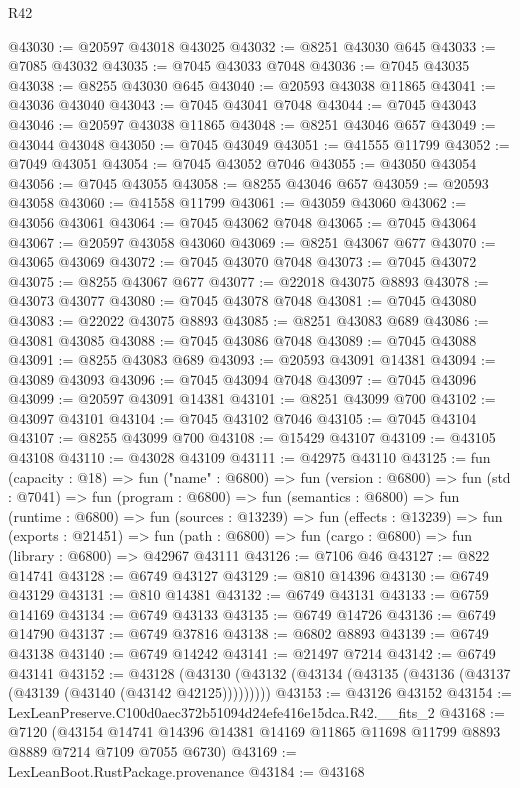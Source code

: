 \begin{lexlean}{R42}
\begin{coremodule}
{@43030 := @20597 @43018 @43025
@43032 := @8251 @43030 @645
@43033 := @7085 @43032
@43035 := @7045 @43033 @7048
@43036 := @7045 @43035
@43038 := @8255 @43030 @645
@43040 := @20593 @43038 @11865
@43041 := @43036 @43040
@43043 := @7045 @43041 @7048
@43044 := @7045 @43043
@43046 := @20597 @43038 @11865
@43048 := @8251 @43046 @657
@43049 := @43044 @43048
@43050 := @7045 @43049
@43051 := @41555 @11799
@43052 := @7049 @43051
@43054 := @7045 @43052 @7046
@43055 := @43050 @43054
@43056 := @7045 @43055
@43058 := @8255 @43046 @657
@43059 := @20593 @43058
@43060 := @41558 @11799
@43061 := @43059 @43060
@43062 := @43056 @43061
@43064 := @7045 @43062 @7048
@43065 := @7045 @43064
@43067 := @20597 @43058 @43060
@43069 := @8251 @43067 @677
@43070 := @43065 @43069
@43072 := @7045 @43070 @7048
@43073 := @7045 @43072
@43075 := @8255 @43067 @677
@43077 := @22018 @43075 @8893
@43078 := @43073 @43077
@43080 := @7045 @43078 @7048
@43081 := @7045 @43080
@43083 := @22022 @43075 @8893
@43085 := @8251 @43083 @689
@43086 := @43081 @43085
@43088 := @7045 @43086 @7048
@43089 := @7045 @43088
@43091 := @8255 @43083 @689
@43093 := @20593 @43091 @14381
@43094 := @43089 @43093
@43096 := @7045 @43094 @7048
@43097 := @7045 @43096
@43099 := @20597 @43091 @14381
@43101 := @8251 @43099 @700
@43102 := @43097 @43101
@43104 := @7045 @43102 @7046
@43105 := @7045 @43104
@43107 := @8255 @43099 @700
@43108 := @15429 @43107
@43109 := @43105 @43108
@43110 := @43028 @43109
@43111 := @42975 @43110
@43125 := fun (capacity : @18) =>
  fun ("name" : @6800) =>
  fun (version : @6800) =>
  fun (std : @7041) =>
  fun (program : @6800) =>
  fun (semantics : @6800) =>
  fun (runtime : @6800) =>
  fun (sources : @13239) =>
  fun (effects : @13239) =>
  fun (exports : @21451) =>
  fun (path : @6800) => fun (cargo : @6800) => fun (library : @6800) => @42967 @43111
@43126 := @7106 @46
@43127 := @822 @14741
@43128 := @6749 @43127
@43129 := @810 @14396
@43130 := @6749 @43129
@43131 := @810 @14381
@43132 := @6749 @43131
@43133 := @6759 @14169
@43134 := @6749 @43133
@43135 := @6749 @14726
@43136 := @6749 @14790
@43137 := @6749 @37816
@43138 := @6802 @8893
@43139 := @6749 @43138
@43140 := @6749 @14242
@43141 := @21497 @7214
@43142 := @6749 @43141
@43152 := @43128
    (@43130 (@43132 (@43134 (@43135 (@43136 (@43137 (@43139 (@43140 (@43142 @42125)))))))))
@43153 := @43126 @43152
@43154 := LexLeanPreserve.C100d0aec372b51094d24efe416e15dca.R42.__fits_2
@43168 := @7120
    (@43154 @14741 @14396 @14381 @14169 @11865 @11698 @11799 @8893 @8889 @7214 @7109 @7055 @6730)
@43169 := LexLeanBoot.RustPackage.provenance
@43184 := @43168
}
\end{coremodule}
\end{lexlean}
